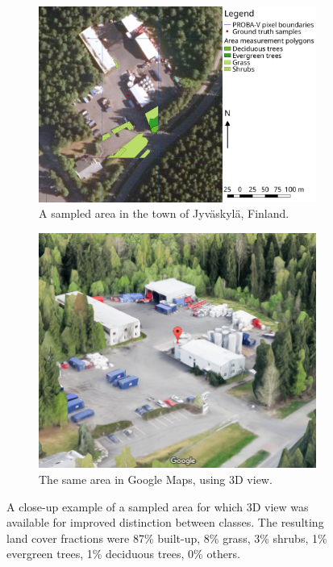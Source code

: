 \documentclass[a4paper,10pt]{book}
\begin{document}
\begin{figure}
  \centering
  \begin{subfigure}[b]{\textwidth}
   \includegraphics[width=\textwidth]{./thesis-figures/sample-example.png}
   \caption{A sampled area in the town of Jyv\"askyl\"a, Finland.}
  \end{subfigure}
  \begin{subfigure}[b]{0.8\textwidth}
   \includegraphics[width=\textwidth]{./thesis-figures/sample-3d.png}
   \caption{The same area in Google Maps, using 3D view.}
  \end{subfigure}
  \caption{A close-up example of a sampled area for which 3D view was available for improved distinction between classes. The resulting land cover fractions were 87\% built-up, 8\% grass, 3\% shrubs, 1\% evergreen trees, 1\% deciduous trees, 0\% others.}
  \label{fig-sampling-detailed}
\end{figure}
\end{document}
